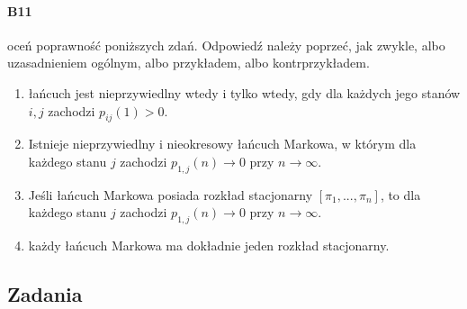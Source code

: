 \documentclass[a4paper,12pt]{article}
\theoremstyle{definition}%
\theoremstyle{definition}
\theoremstyle{problem}
\begin{document}
\paragraph{B11} oceń poprawność poniższych zdań. Odpowiedź należy poprzeć, jak zwykle, albo uzasadnieniem ogólnym, albo przykładem, albo kontrprzykładem.
\begin{enumerate}[label=\alph*)]
\item łańcuch jest nieprzywiedlny wtedy i tylko wtedy, gdy dla każdych jego stanów $i, j$ zachodzi $p_{ij}(1) > 0$.
\item Istnieje nieprzywiedlny i nieokresowy łańcuch Markowa, w którym dla każdego stanu $j$ zachodzi $p_{1,j} (n) \rightarrow 0$ przy $n \to \infty$.
\item Jeśli łańcuch Markowa posiada rozkład stacjonarny $[\pi_1, . . . , \pi_n]$, to dla każdego stanu $j$ zachodzi $p_{1,j} (n) \rightarrow 0$ przy $n \to \infty$.
\item każdy łańcuch Markowa ma dokładnie jeden rozkład stacjonarny.
\end{enumerate}

\subsection{Zadania}
\end{document}
